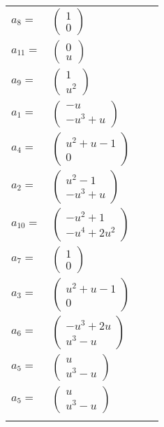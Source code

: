 \documentclass[1p]{elsarticle_modified}
\theoremstyle{definition}
\begin{document}
\begin{tabular}{m{7pt} m{180pt} m{7pt} m{180pt} }
\flushright $a_{8}=$&$\begin{pmatrix}1\\0\end{pmatrix}$ \\
\flushright $a_{11}=$&$\begin{pmatrix}0\\u\end{pmatrix}$ \\
\flushright $a_{9}=$&$\begin{pmatrix}1\\u^2\end{pmatrix}$ \\
\flushright $a_{1}=$&$\begin{pmatrix}- u\\- u^3+u\end{pmatrix}$ \\
\flushright $a_{4}=$&$\begin{pmatrix}u^2+u-1\\0\end{pmatrix}$ \\
\flushright $a_{2}=$&$\begin{pmatrix}u^2-1\\- u^3+u\end{pmatrix}$ \\
\flushright $a_{10}=$&$\begin{pmatrix}- u^2+1\\- u^4+2 u^2\end{pmatrix}$ \\
\flushright $a_{7}=$&$\begin{pmatrix}1\\0\end{pmatrix}$ \\
\flushright $a_{3}=$&$\begin{pmatrix}u^2+u-1\\0\end{pmatrix}$ \\
\flushright $a_{6}=$&$\begin{pmatrix}- u^3+2 u\\u^3- u\end{pmatrix}$ \\
\flushright $a_{5}=$&$\begin{pmatrix}u\\u^3- u\end{pmatrix}$\\ \flushright $a_{5}=$&$\begin{pmatrix}u\\u^3- u\end{pmatrix}$\\&\end{tabular}
\end{document}
